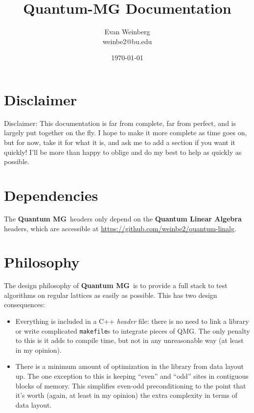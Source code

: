 \documentclass[pdftex,letterpaper,10pt]{article}
\newcommand{\qmg}{{\textbf{Quantum MG}}~}
\begin{document}
\title{Quantum-MG Documentation}
\author{Evan Weinberg\\weinbe2@bu.edu}
\date{\today}
\maketitle

\tableofcontents

\section{Disclaimer}

Disclaimer: This documentation is far from complete, far from perfect, and is largely put together on the fly. I hope to make it more complete as time goes on, but for now, take it for what it is, and ask me to add a section if you want it quickly! I'll be more than happy to oblige and do my best to help as quickly as possible. 

\section{Dependencies}

The \qmg headers only depend on the {\textbf{Quantum Linear Algebra}} headers, which are accessible at \url{https://github.com/weinbe2/quantum-linalg}. 

\section{Philosophy}

The design philosophy of \qmg is to provide a full stack to test algorithms on regular lattices as easily as possible. This has two design consequences:

\begin{itemize}
\item Everything is included in a C++ {\emph{header}} file: there is no need to link a library or write complicated {\texttt{makefile}}s to integrate pieces of QMG. The only penalty to this is it adds to compile time, but not in any unreasonable way (at least in my opinion).
\item There is a minimum amount of optimization in the library from data layout up. The one exception to this is keeping ``even'' and ``odd'' sites in contiguous blocks of memory. This simplifies even-odd preconditioning to the point that it's worth (again, at least in my opinion) the extra complexity in terms of data layout. 
\end{itemize}
\end{document}
